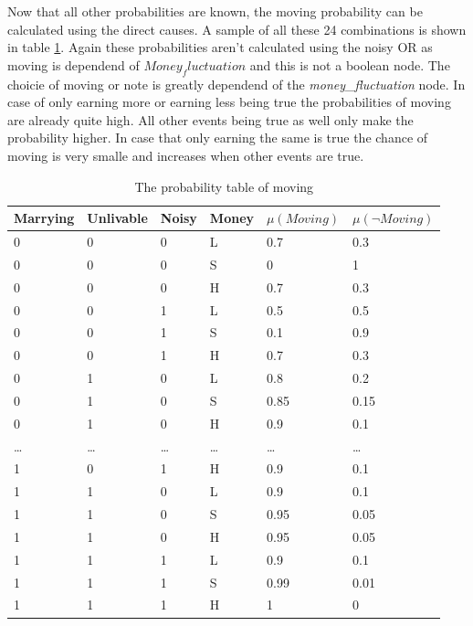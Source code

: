 \documentclass[12pt]{article} %
\begin{document}
Now that all other probabilities are known, the moving probability can be
calculated using the direct causes. A sample of all these 24 combinations is
shown in table \ref{moving}. Again these probabilities aren't calculated using
the noisy OR as moving is dependend of $Money_fluctuation$ and this is not a
boolean node. The choicie of moving or note is greatly dependend of the
\emph{money\_fluctuation} node. In case of only earning more or earning less
being true the
probabilities of moving are already quite high. All other events being true as
well only make the probability higher. In case that only earning the same is
true the chance of moving is very smalle and increases when other events are
true.

\begin{centering}
\small
\begin{table}
\begin{tabular}{|llll|ll|}
  \hline
  Marrying & Unlivable & Noisy & Money &  $\mu(Moving)$ & $\mu(\neg Moving)$   \\ \hline
  0 & 0 & 0 & L & 0.7 & 0.3 \\
  0 & 0 & 0 & S & 0 & 1 \\
  0 & 0 & 0 & H & 0.7& 0.3   \\
  0 & 0 & 1 & L & 0.5  & 0.5  \\ 
  0 & 0 & 1 & S & 0.1  & 0.9  \\ 
  0 & 0 & 1 & H & 0.7  & 0.3   \\ 
  0 & 1 & 0 & L & 0.8  & 0.2  \\ 
  0 & 1 & 0 & S & 0.85  & 0.15  \\ 
  0 & 1 & 0 & H & 0.9  &  0.1  \\ 
  \dots  &\dots   &\dots   &\dots   & \dots     &\dots \\
  1 & 0 & 1 & H & 0.9  & 0.1  \\ 
  1 & 1 & 0 & L & 0.9  & 0.1  \\ 
  1 & 1 & 0 & S & 0.95  & 0.05   \\ 
  1 & 1 & 0 & H & 0.95  & 0.05  \\ 
  1 & 1 & 1 & L & 0.9  & 0.1  \\ 
  1 & 1 & 1 & S & 0.99  & 0.01  \\ 
  1 & 1 & 1 & H & 1  & 0   \\ 
  \hline
\end{tabular}
\caption{The probability table of moving}
\label{moving}
\end{table}

\end{centering}
\end{document}
